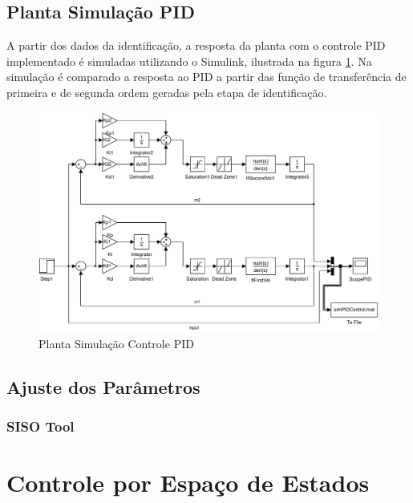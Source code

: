 \documentclass[a4paper,11pt]{article}
\begin{document}

\subsection{Planta Simulação PID}

A partir dos dados da identificação, a resposta da planta com o controle PID implementado é simuladas utilizando o Simulink, ilustrada na figura \ref{fig:pidControlPlant}. Na simulação é comparado a resposta ao PID a partir das função de transferência de primeira e de segunda ordem geradas pela etapa de identificação.

\begin{figure}[H]
    \centering
    \includegraphics[width=1.0\linewidth]{tex/img/dcMotorControl.pdf}
    \caption{Planta Simulação Controle PID}
    \label{fig:pidControlPlant}
\end{figure}

\subsection{Ajuste dos Parâmetros}

\subsubsection{SISO Tool}


\section{Controle por Espaço de Estados}
\end{document}
